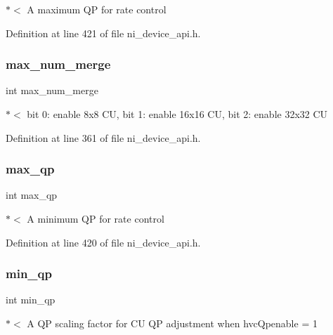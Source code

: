 $\ast$$<$ A maximum QP for rate control 

Definition at line 421 of file ni\+\_\+device\+\_\+api.\+h.

\mbox{\label{struct__ni__h265__encoder__params_aedcd486a694046c0fa431385d675d6ae}} 
\subsubsection{\texorpdfstring{max\_num\_merge}{max\_num\_merge}}
{\footnotesize\ttfamily int max\+\_\+num\+\_\+merge}

$\ast$$<$ bit 0\+: enable 8x8 CU, bit 1\+: enable 16x16 CU, bit 2\+: enable 32x32 CU 

Definition at line 361 of file ni\+\_\+device\+\_\+api.\+h.

\mbox{\label{struct__ni__h265__encoder__params_acff03cfff15f1a977034e13c3b0e22b3}} 
\subsubsection{\texorpdfstring{max\_qp}{max\_qp}}
{\footnotesize\ttfamily int max\+\_\+qp}

$\ast$$<$ A minimum QP for rate control 

Definition at line 420 of file ni\+\_\+device\+\_\+api.\+h.

\mbox{\label{struct__ni__h265__encoder__params_ae2cec09c3e909a286c748752e64b525f}} 
\subsubsection{\texorpdfstring{min\_qp}{min\_qp}}
{\footnotesize\ttfamily int min\+\_\+qp}

$\ast$$<$ A QP scaling factor for CU QP adjustment when hvc\+Qpenable = 1 

